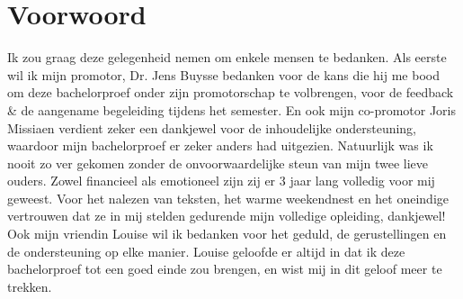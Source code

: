 
\chapter*{Voorwoord}
\label{ch:voorwoord}


Ik zou graag deze gelegenheid nemen om enkele mensen te bedanken. 
Als eerste wil ik mijn promotor, Dr. Jens Buysse bedanken voor de
kans die hij me bood om deze bachelorproef onder zijn promotorschap te volbrengen, voor
de feedback \& de aangename begeleiding tijdens het semester. En ook mijn co-promotor Joris Missiaen verdient zeker een dankjewel voor de inhoudelijke ondersteuning, waardoor mijn bachelorproef er zeker anders had uitgezien.
Natuurlijk was ik nooit zo ver gekomen zonder de onvoorwaardelijke steun van
mijn twee lieve ouders. Zowel financieel als emotioneel zijn zij er 3 jaar lang volledig
voor mij geweest. Voor het nalezen van teksten, het warme weekendnest en het oneindige vertrouwen dat ze in mij stelden
gedurende mijn volledige opleiding, dankjewel! Ook mijn vriendin Louise wil ik bedanken voor het geduld, de gerustellingen en de ondersteuning op elke manier. Louise geloofde er altijd in dat ik deze bachelorproef tot een goed einde zou brengen, en wist mij in dit geloof meer te trekken.